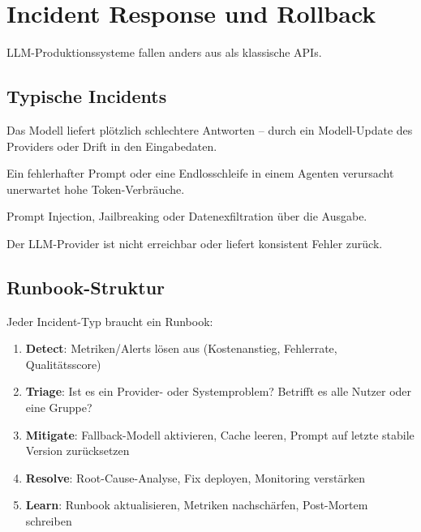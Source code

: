 \section{Incident Response und Rollback}

LLM-Produktionssysteme fallen anders aus als klassische APIs.

\subsection{Typische Incidents}

\begin{description}[leftmargin=*,style=nextline]
    \item[Qualitätseinbruch] Das Modell liefert plötzlich schlechtere Antworten -- durch ein Modell-Update des Providers oder Drift in den Eingabedaten.
    \item[Kosten-Explosion] Ein fehlerhafter Prompt oder eine Endlosschleife in einem Agenten verursacht unerwartet hohe Token-Verbräuche.
    \item[Security Incident] Prompt Injection, Jailbreaking oder Datenexfiltration über die Ausgabe.
    \item[Provider-Ausfall] Der LLM-Provider ist nicht erreichbar oder liefert konsistent Fehler zurück.
\end{description}

\subsection{Runbook-Struktur}

Jeder Incident-Typ braucht ein Runbook:

\begin{enumerate}[leftmargin=*]
    \item \textbf{Detect}: Metriken/Alerts lösen aus (Kostenanstieg, Fehlerrate, Qualitätsscore)
    \item \textbf{Triage}: Ist es ein Provider- oder Systemproblem? Betrifft es alle Nutzer oder eine Gruppe?
    \item \textbf{Mitigate}: Fallback-Modell aktivieren, Cache leeren, Prompt auf letzte stabile Version zurücksetzen
    \item \textbf{Resolve}: Root-Cause-Analyse, Fix deployen, Monitoring verstärken
    \item \textbf{Learn}: Runbook aktualisieren, Metriken nachschärfen, Post-Mortem schreiben
\end{enumerate}

